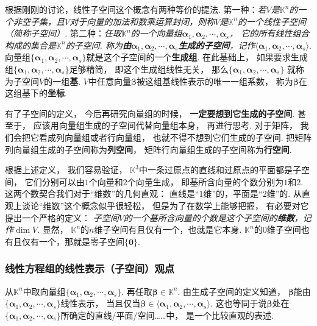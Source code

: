 根据刚刚的讨论，线性子空间这个概念有两种等价的提法.
第一种：\textit{若$V$是$\mathbb{K}^n$的一个非空子集，且$V$对于向量的加法和数乘运算封闭，则称$V$是$\mathbb{K}^n$的一个线性子空间（简称子空间）.}
第二种：\textit{任取$\mathbb{K}^n$的一个向量组$\bm{\alpha}_1, \bm{\alpha}_2 , \cdots , \bm{\alpha}_s $，
它的所有线性组合构成的集合是$\mathbb{K}^n$的子空间.
称为\textbf{由$\bm{\alpha}_1, \bm{\alpha}_2 , \cdots , \bm{\alpha}_s$生成的子空间}，记作$\langle \bm{\alpha}_1, \bm{\alpha}_2 , \cdots , \bm{\alpha}_s \rangle$}.
向量组$\{\bm{\alpha}_1, \bm{\alpha}_2 , \cdots , \bm{\alpha}_s\}$就是这个子空间的一个\textbf{生成组}.
在此基础上，
如果要求生成组$\{ \bm{\alpha}_1, \bm{\alpha}_2 , \cdots , \bm{\alpha}_s \}$足够精简，
即这个生成组线性无关，
那么$\{ \bm{\alpha}_1, \bm{\alpha}_2 , \cdots , \bm{\alpha}_s \}$
就称为子空间$V$的一组\textbf{基}.
$V$中任意向量$\bm{\beta}$被这组基线性表示的唯一一组系数，
称为$\bm{\beta}$在这组基下的\textbf{坐标}.

有了子空间的定义，
今后再研究向量组的时候，
\textbf{一定要想到它生成的子空间}.
甚至于，
应该用向量组生成的子空间代替向量组本身，
再进行思考.
对于矩阵，
我们会把它看成列向量组或者行向量组，
也就不得不想到它们生成的子空间.
把矩阵列向量组生成的子空间称为\textbf{列空间}，
矩阵行向量组生成的子空间称为\textbf{行空间}.

根据上述定义，
我们容易验证，
$\mathbb{K}^3$中一条过原点的直线和过原点的平面都是子空间，
它们分别可以由$1$个向量和$2$个向量生成，
即基所含向量的个数分别为$1$和$2$.
这两个数契合我们对于“维数”的几何直观：
直线是“$1$维”的，平面是“$2$维”的.
从直观上谈论“维数”这个概念似乎很轻松，
但是为了在数学上能够把握，
有必要对它提出一个严格的定义：
\textit{子空间$V$的一个基所含向量的个数是这个子空间的\textbf{维数}，记作}$\dim V$.
显然，
$\mathbb{K}^n$的$n$维子空间有且仅有一个，也就是它本身.
$\mathbb{K}^n$的$0$维子空间也有且仅有一个，那就是零子空间$\{\bm{0}\}$.

\subsubsection{线性方程组的线性表示（子空间）观点}

从$\mathbb{K}^n$中取向量组$\{ \bm{\alpha}_1 , \bm{\alpha}_2 , \cdots , \bm{\alpha}_s \}$.
再任取$\bm{\beta} \in \mathbb{K}^n$.
由生成子空间的定义知道，
$\bm{\beta}$能由$\{ \bm{\alpha}_1 , \bm{\alpha}_2 , \cdots , \bm{\alpha}_s \}$线性表示，
当且仅当$\bm{\beta} \in \langle \bm{\alpha}_1 , \bm{\alpha}_2 , \cdots , \bm{\alpha}_s \rangle$.
这也等同于说$\bm{\beta}$处在$\{ \bm{\alpha}_1 , \bm{\alpha}_2 , \cdots , \bm{\alpha}_s \}$所确定的直线/平面/空间……中，
是一个比较直观的表述.

